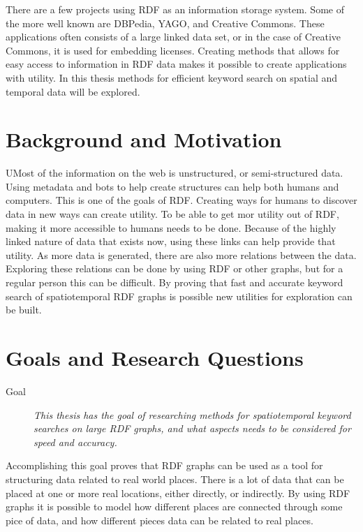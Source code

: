 There are a few projects using RDF as an information storage system. Some of the more well known are DBPedia\cite{dbpedia}, YAGO\cite{yago}, and Creative Commons. These applications often consists of a large linked data set, or in the case of Creative Commons, it is used for embedding licenses. Creating methods that allows for easy access to information in RDF data makes it possible to create applications with utility. In this thesis methods for efficient keyword search on spatial and temporal data will be explored.

\section{Background and Motivation}
\label{sec:BackgroundAndMotivation}
UMost of the information on the web is unstructured, or semi-structured data. Using metadata and bots to help create structures can help both humans and computers. This is one of the goals of RDF. Creating ways for humans to discover data in new ways can create utility. To be able to get mor utility out of RDF, making it more accessible to humans needs to be done. Because of the highly linked nature of data that exists now, using these links can help provide that utility. As more data is generated, there are also more relations between the data. Exploring these relations can be done by using RDF or other graphs, but for a regular person this can be difficult. By proving that fast and accurate keyword search of spatiotemporal RDF graphs is possible new utilities for exploration can be built.


\section{Goals and Research Questions}
\label{sec:Goals and Research Questions}
\begin{description}
    \item[Goal] {\em This thesis has the goal of researching methods for spatiotemporal keyword searches on large RDF graphs, and what aspects needs to be considered for speed and accuracy.}
\end{description}
Accomplishing this goal proves that RDF graphs can be used as a tool for structuring data related to real world places. There is a lot of data that can be placed at one or more real locations, either directly, or indirectly. By using RDF graphs it is possible to model how different places are connected through some pice of data, and how different pieces data can be related to real places.

